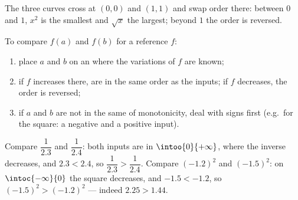 \begin{omfigure}

{\small The three curves cross at $(0,0)$ and $(1,1)$ and swap order
there: between $0$ and $1$, $x^2$ is the smallest and $\sqrt x$ the
largest; beyond $1$ the order is reversed.}
\end{omfigure}

\begin{method}\label{met:g10:reffunc:compare}
To compare $f(a)$ and $f(b)$ for a reference  $f$:
\begin{enumerate}
  \item place $a$ and $b$ on an  where the variations of $f$ are
        known;
  \item if $f$ increases there,  are in the same order as the
        inputs; if $f$ decreases, the order is reversed;
  \item if $a$ and $b$ are not in the same  of monotonicity, deal
        with signs first (e.g.\ for the square: a negative and a positive
        input).
\end{enumerate}
\end{method}

\begin{example}
Compare $\dfrac{1}{2.3}$ and $\dfrac{1}{2.4}$: both inputs are in
$\intoo{0}{+\infty}$, where the inverse  decreases, and
$2.3 < 2.4$, so $\dfrac{1}{2.3} > \dfrac{1}{2.4}$. Compare $(-1.2)^2$
and $(-1.5)^2$: on $\intoc{-\infty}{0}$ the square decreases, and
$-1.5 < -1.2$, so $(-1.5)^2 > (-1.2)^2$ --- indeed $2.25 > 1.44$.
\end{example}

